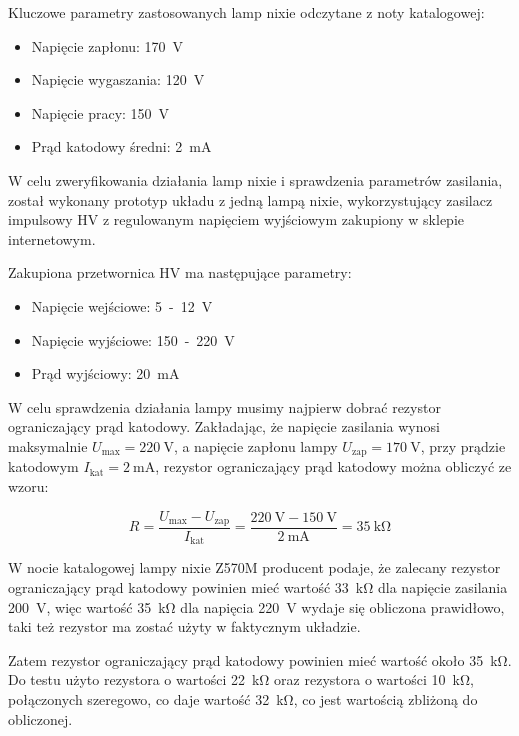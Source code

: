 \documentclass[../main.tex]{subfiles}
\begin{document}
Kluczowe parametry zastosowanych lamp nixie odczytane z noty katalogowej:
\begin{itemize}
    \item Napięcie zapłonu: \SI{170}{\volt}
    \item Napięcie wygaszania: \SI{120}{\volt}
    \item Napięcie pracy: \SI{150}{\volt}
    \item Prąd katodowy średni: \SI{2}{\milli\ampere}
\end{itemize}

W celu zweryfikowania działania lamp nixie i sprawdzenia parametrów zasilania, został wykonany prototyp układu z jedną lampą nixie,
wykorzystujący zasilacz impulsowy HV z regulowanym napięciem wyjściowym zakupiony w sklepie internetowym.

Zakupiona przetwornica HV ma następujące parametry:
\begin{itemize}
    \item Napięcie wejściowe: \SI{5}-\SI{12}{\volt}
    \item Napięcie wyjściowe: \SI{150}-\SI{220}{\volt}
    \item Prąd wyjściowy: \SI{20}{\milli\ampere}
\end{itemize}

W celu sprawdzenia działania lampy musimy najpierw dobrać rezystor ograniczający prąd katodowy.
Zakładając, że napięcie zasilania wynosi maksymalnie $U_{\text{max}} = \SI{220}{\volt}$, a napięcie zapłonu lampy $U_{\text{zap}} = \SI{170}{\volt}$,
przy prądzie katodowym $I_{\text{kat}} = \SI{2}{\milli\ampere}$, rezystor ograniczający prąd katodowy można obliczyć ze wzoru:

\begin{equation}
    R = \frac{U_{\text{max}} - U_{\text{zap}}}{I_{\text{kat}}} = \frac{\SI{220}{\volt} - \SI{150}{\volt}}{\SI{2}{\milli\ampere}} = \SI{35}{\kilo\ohm}
\end{equation}

W nocie katalogowej lampy nixie Z570M producent podaje, że zalecany rezystor ograniczający prąd katodowy 
powinien mieć wartość \SI{33}{\kilo\ohm} dla napięcie zasilania \SI{200}{\volt}, więc wartość \SI{35}{\kilo\ohm} dla napięcia \SI{220}{\volt}
wydaje się obliczona prawidłowo, taki też rezystor ma zostać użyty w faktycznym układzie.

Zatem rezystor ograniczający prąd katodowy powinien mieć wartość około \SI{35}{\kilo\ohm}.
Do testu użyto rezystora o wartości \SI{22}{\kilo\ohm} oraz rezystora o wartości \SI{10}{\kilo\ohm}, połączonych
szeregowo, co daje wartość \SI{32}{\kilo\ohm}, co jest wartością zbliżoną do obliczonej.
\end{document}
